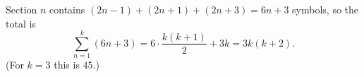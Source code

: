 Section $n$ contains $(2n-1)+(2n+1)+(2n+3)=6n+3$ symbols, so the total is
\[\sum_{n=1}^{k}(6n+3)=6\cdot\dfrac{k(k+1)}{2}+3k=\boxed{3k(k+2)}.\]
(For $k=3$ this is $45$.)
